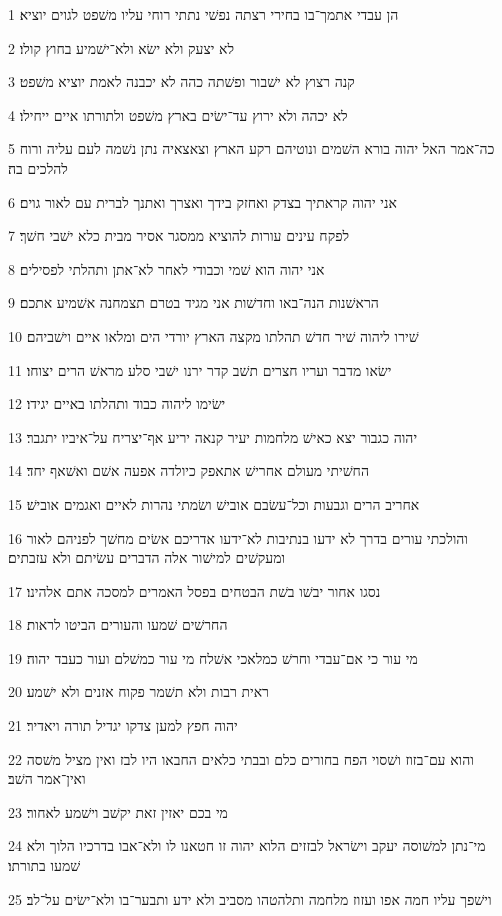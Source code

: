 \par 1 הן עבדי אתמך־בו בחירי רצתה נפשׁי נתתי רוחי עליו משׁפט לגוים יוציא׃
\par 2 לא יצעק ולא ישׂא ולא־ישׁמיע בחוץ קולו׃
\par 3 קנה רצוץ לא ישׁבור ופשׁתה כהה לא יכבנה לאמת יוציא משׁפט׃
\par 4 לא יכהה ולא ירוץ עד־ישׂים בארץ משׁפט ולתורתו איים ייחילו׃
\par 5 כה־אמר האל יהוה בורא השׁמים ונוטיהם רקע הארץ וצאצאיה נתן נשׁמה לעם עליה ורוח להלכים בה׃
\par 6 אני יהוה קראתיך בצדק ואחזק בידך ואצרך ואתנך לברית עם לאור גוים׃
\par 7 לפקח עינים עורות להוציא ממסגר אסיר מבית כלא ישׁבי חשׁך׃
\par 8 אני יהוה הוא שׁמי וכבודי לאחר לא־אתן ותהלתי לפסילים׃
\par 9 הראשׁנות הנה־באו וחדשׁות אני מגיד בטרם תצמחנה אשׁמיע אתכם׃
\par 10 שׁירו ליהוה שׁיר חדשׁ תהלתו מקצה הארץ יורדי הים ומלאו איים וישׁביהם׃
\par 11 ישׂאו מדבר ועריו חצרים תשׁב קדר ירנו ישׁבי סלע מראשׁ הרים יצוחו׃
\par 12 ישׂימו ליהוה כבוד ותהלתו באיים יגידו׃
\par 13 יהוה כגבור יצא כאישׁ מלחמות יעיר קנאה יריע אף־יצריח על־איביו יתגבר׃
\par 14 החשׁיתי מעולם אחרישׁ אתאפק כיולדה אפעה אשׁם ואשׁאף יחד׃
\par 15 אחריב הרים וגבעות וכל־עשׂבם אובישׁ ושׂמתי נהרות לאיים ואגמים אובישׁ׃
\par 16 והולכתי עורים בדרך לא ידעו בנתיבות לא־ידעו אדריכם אשׂים מחשׁך לפניהם לאור ומעקשׁים למישׁור אלה הדברים עשׂיתם ולא עזבתים׃
\par 17 נסגו אחור יבשׁו בשׁת הבטחים בפסל האמרים למסכה אתם אלהינו׃
\par 18 החרשׁים שׁמעו והעורים הביטו לראות׃
\par 19 מי עור כי אם־עבדי וחרשׁ כמלאכי אשׁלח מי עור כמשׁלם ועור כעבד יהוה׃
\par 20 ראית רבות ולא תשׁמר פקוח אזנים ולא ישׁמע׃
\par 21 יהוה חפץ למען צדקו יגדיל תורה ויאדיר׃
\par 22 והוא עם־בזוז ושׁסוי הפח בחורים כלם ובבתי כלאים החבאו היו לבז ואין מציל משׁסה ואין־אמר השׁב׃
\par 23 מי בכם יאזין זאת יקשׁב וישׁמע לאחור׃
\par 24 מי־נתן למשׁוסה יעקב וישׂראל לבזזים הלוא יהוה זו חטאנו לו ולא־אבו בדרכיו הלוך ולא שׁמעו בתורתו׃
\par 25 וישׁפך עליו חמה אפו ועזוז מלחמה ותלהטהו מסביב ולא ידע ותבער־בו ולא־ישׂים על־לב׃

